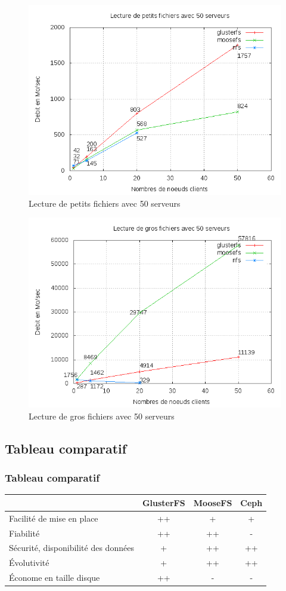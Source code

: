 \documentclass[blue]{beamer}
\begin{document}
		\begin{frame}
			\begin{figure}
				\includegraphics[width=0.75\linewidth]{../images/srv50rs2.png}
				\caption{Lecture de petits fichiers avec 50 serveurs}
			\end{figure}
		\end{frame}

		\begin{frame}
			\begin{figure}
				\includegraphics[width=0.75\linewidth]{../images/srv50rb2.png}
				\caption{Lecture de gros fichiers avec 50 serveurs}
			\end{figure}
		\end{frame}

	\subsection{Tableau comparatif}
		\begin{frame}
		\frametitle{Tableau comparatif}
			\begin{tabular}{|l|c|c|c|}
				\hline
				& \bf{GlusterFS} & \bf{MooseFS} & \bf{Ceph}\\
				\hline
				Facilité de mise en place & ++ & + & +\\
				\hline
				Fiabilité & ++ & ++ & -\\
				\hline
				Sécurité, disponibilité des données & + & ++ & ++ \\
				\hline
				Évolutivité & + & ++  & ++\\
				\hline
				Économe en taille disque & ++ & - & - \\
				\hline
			\end{tabular}
		\end{frame}
\end{document}

